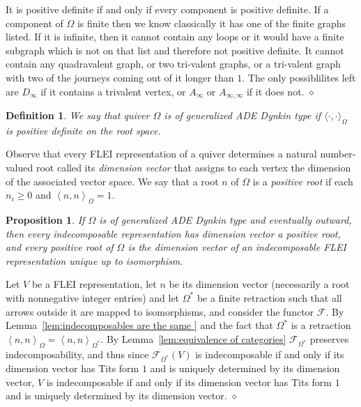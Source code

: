 \documentclass{article}
\newcommand{\FF}{\mathscr{F}}
\newcommand{\bracket}[1]{\left \langle #1 \right\rangle}
\newtheorem{proposition}{Proposition}[section]
\newtheorem{definition}{Definition}
\newenvironment{proof}{\vspace*{2ex}\noindent {\em Proof:}
}{\hfill $\diamond$ \\[2ex]}
\begin{document}
\begin{proof}
It is positive definite if and only if every component is positive definite.  If a component of $\Omega$ is finite then we know classically it has one of the finite graphs listed. If it is infinite, then it cannot contain any loops or it would have a finite subgraph which is not on that list and therefore not positive definite.  It cannot contain any quadravalent graph, or two tri-valent graphs, or a tri-valent graph with two of the journeys coming out of it longer than $1$.  The only possiblilites left are $D_\infty$ if it contains a trivalent vertex, or $A_\infty$ or $A_{\infty, \infty}$ if it does not. 
\end{proof}

\begin{definition}
    We say that  quiver $\Omega$ is of generalized \emph{ADE  Dynkin type} if $\langle \cdot , \cdot \rangle_\Omega$ is positive definite on the root space. 
\end{definition}

Observe that every FLEI representation of a quiver determines a natural number-valued root called its \emph{dimension vector} that assigns to each vertex the dimension of the associated vector space. We say that a root $n$ of $\Omega$ is a \emph{positive root} if each $n_i \geq 0$ and $\bracket{n,n}_{\Omega} = 1$. 

\begin{proposition} \label{pr: positive roots}
If $\Omega$ is of generalized ADE Dynkin type and eventually outward, then every indecomposable representation has dimension vector a positive root, and every positive root of $\Omega$ is the dimension vector of an indecomposable FLEI representation unique up to isomorphism.
\end{proposition}

\begin{proof}
  Let $V$ be a FLEI representation, let $n$ be its dimension vector (necessarily a root with nonnegative integer entries) and let $\Omega^*$ be a finite retraction such that all arrows outside it are mapped to isomorphisms, and consider the functor $\FF.$  By Lemma~\ref{lem:indecomposables are the same } and the fact that $\Omega^*$ is a retraction $\bracket{n,n}_{\Omega}=\bracket{n,n}_{\Omega^*}$.   By Lemma~\ref{lem:equivalence of categories}  $\FF_{\Omega^*}$ preserves indecomposability, and thus since $\FF_{\Omega^*}(V)$ is indecomposable if and only if its dimension vector has Tits form $1$ and is uniquely determined by its dimension vector, $V$ is indecomposable if and only if its dimension vector has Tits form $1$ and is uniquely determined by its dimension vector.
\end{proof}
\end{document}
